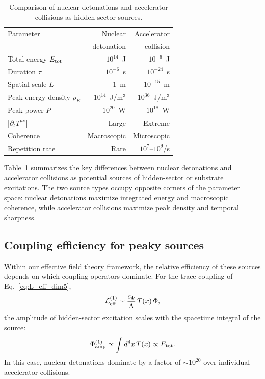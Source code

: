 \documentclass[aps,prd,twocolumn,nofootinbib,superscriptaddress]{revtex4-2}
\begin{document}
\begin{table}[h]
\caption{Comparison of nuclear detonations and accelerator collisions as hidden-sector sources.}
\label{tab:source_comparison}
\begin{ruledtabular}
\begin{tabular}{lrr}
Parameter & Nuclear   & Accelerator  \\
 &  detonation &  collision \\
\hline
Total energy $E_{\rm tot}$ & $10^{14}$~J & $10^{-6}$~J \\
Duration $\tau$ & $10^{-6}$~s & $10^{-24}$~s \\
Spatial scale $L$ & $1$~m & $10^{-15}$~m \\
Peak energy density $\rho_E$ & $10^{14}$~J/m$^3$ & $10^{36}$~J/m$^3$ \\
Peak power $P$ & $10^{20}$~W & $10^{18}$~W \\
$|\partial_t T^{\mu\nu}|$ & Large & Extreme \\
Coherence & Macroscopic & Microscopic \\
Repetition rate & Rare & $10^{7}$--$10^{9}$/s \\
\end{tabular}
\end{ruledtabular}
\end{table}


Table~\ref{tab:source_comparison} summarizes the key differences between nuclear detonations and accelerator collisions as potential sources of hidden-sector or substrate excitations.
The two source types occupy opposite corners of the parameter space: nuclear detonations maximize integrated energy and macroscopic coherence, while accelerator collisions maximize peak density and temporal sharpness.

\subsection{Coupling efficiency for peaky sources}

Within our effective field theory framework, the relative efficiency of these sources depends on which coupling operators dominate. For the trace coupling of Eq.~\eqref{eq:L_eff_dim5},
\begin{equation}
    \mathcal{L}_{\rm eff}^{(1)} \sim \frac{c_{\Phi}}{\Lambda} \, T(x) \, \Phi,
\end{equation}
the amplitude of hidden-sector excitation scales with the spacetime integral of the source:
\begin{equation}
    \Phi_{\rm amp}^{(1)} \propto \int d^4x \, T(x) \propto E_{\rm tot}.
\end{equation}
In this case, nuclear detonations dominate by a factor of $\sim 10^{20}$ over individual accelerator collisions.
\end{document}
